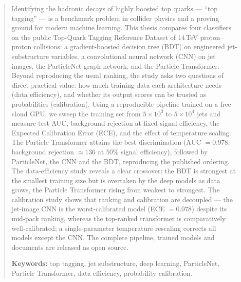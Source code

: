 \begin{abstract}
Identifying the hadronic decays of highly boosted top quarks --- ``top
tagging'' --- is a benchmark problem in collider physics and a proving
ground for modern machine learning. This thesis compares four classifiers
on the public Top-Quark Tagging Reference Dataset of 14\,TeV
proton--proton collisions: a gradient-boosted decision tree (BDT) on
engineered jet-substructure variables, a convolutional neural network (CNN)
on jet images, the ParticleNet graph network, and the Particle Transformer.
Beyond reproducing the usual ranking, the study asks two questions of direct
practical value: how much training data each architecture needs (data
efficiency), and whether its output scores can be trusted as probabilities
(calibration). Using a reproducible pipeline trained on a free cloud GPU, we
sweep the training set from $5\times10^{3}$ to $5\times10^{4}$ jets and
measure test AUC, background rejection at fixed signal efficiency, the
Expected Calibration Error (ECE), and the effect of temperature scaling. The
Particle Transformer attains the best discrimination (AUC $=0.978$,
background rejection $\approx136$ at $50\%$ signal efficiency), followed by
ParticleNet, the CNN and the BDT, reproducing the published ordering. The
data-efficiency study reveals a clear crossover: the BDT is strongest at the
smallest training size but is overtaken by the deep models as data grows,
the Particle Transformer rising from weakest to strongest. The calibration
study shows that ranking and calibration are decoupled --- the jet-image CNN
is the worst-calibrated model (ECE $=0.078$) despite its mid-pack ranking,
whereas the top-ranked transformer is comparatively well-calibrated; a
single-parameter temperature rescaling corrects all models except the CNN.
The complete pipeline, trained models and documents are released as open
source.

\vspace{2mm}
\noindent\textbf{Keywords:} top tagging, jet substructure, deep learning,
ParticleNet, Particle Transformer, data efficiency, probability calibration.
\end{abstract}
